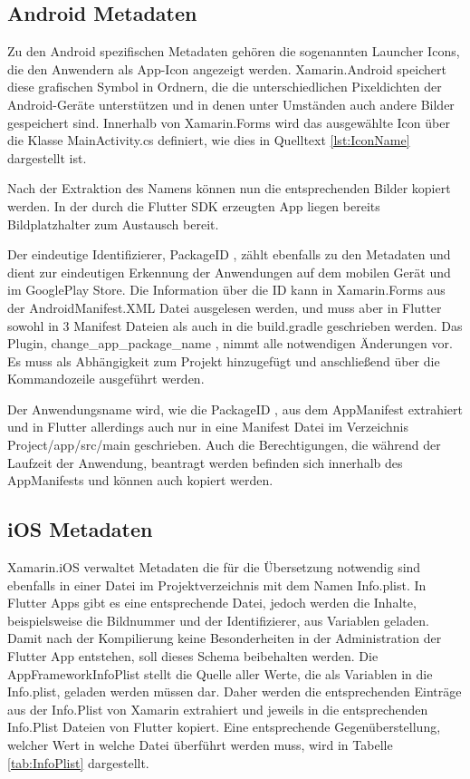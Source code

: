 \subsection{Android Metadaten}
Zu den Android spezifischen Metadaten gehören die sogenannten Launcher Icons, die den Anwendern als App-Icon angezeigt werden. Xamarin.Android speichert diese grafischen Symbol in Ordnern, die die unterschiedlichen Pixeldichten der Android-Geräte unterstützen und in denen unter Umständen auch andere Bilder gespeichert sind.  Innerhalb von Xamarin.Forms wird das ausgewählte Icon über die Klasse MainActivity.cs definiert, wie dies in Quelltext \ref{lst:IconName} dargestellt ist. 



Nach der Extraktion des Namens können nun die entsprechenden Bilder kopiert werden.  In der durch die Flutter SDK erzeugten App liegen bereits Bildplatzhalter zum Austausch bereit.

Der eindeutige Identifizierer,  PackageID ,  zählt ebenfalls zu den Metadaten und dient zur eindeutigen Erkennung der Anwendungen auf dem mobilen Gerät und im GooglePlay Store.  Die Information über die ID kann in Xamarin.Forms aus der AndroidManifest.XML Datei ausgelesen  werden, und muss aber in Flutter sowohl in 3 Manifest Dateien als auch in die build.gradle geschrieben werden. Das Plugin,  \glq change\_app\_package\_name \grq , nimmt alle notwendigen Änderungen vor. Es muss als Abhängigkeit zum Projekt hinzugefügt und anschließend über die Kommandozeile ausgeführt werden. 

Der Anwendungsname wird, wie die PackageID , aus dem AppManifest extrahiert und in Flutter allerdings auch nur in eine Manifest Datei im Verzeichnis Project/app/src/main\grq{} geschrieben.  Auch die Berechtigungen, die während der Laufzeit der Anwendung, beantragt werden befinden sich innerhalb des AppManifests und können auch kopiert werden.

\subsection{iOS Metadaten}
Xamarin.iOS verwaltet Metadaten die für die Übersetzung notwendig sind ebenfalls in einer Datei im Projektverzeichnis mit dem Namen Info.plist.  In Flutter Apps gibt es eine entsprechende Datei,  jedoch werden die Inhalte,  beispielsweise die Bildnummer und der Identifizierer,  aus Variablen geladen.  Damit nach der Kompilierung keine Besonderheiten in der Administration der Flutter App entstehen,  soll dieses Schema beibehalten werden.  Die AppFrameworkInfoPlist stellt die Quelle aller Werte,  die als Variablen in die Info.plist, geladen werden müssen dar.   Daher werden die entsprechenden Einträge aus der Info.Plist von Xamarin extrahiert und jeweils in die entsprechenden Info.Plist Dateien von Flutter kopiert.  Eine entsprechende Gegenüberstellung, welcher Wert in welche Datei überführt werden muss,  wird in Tabelle \ref{tab:InfoPlist} dargestellt. 


